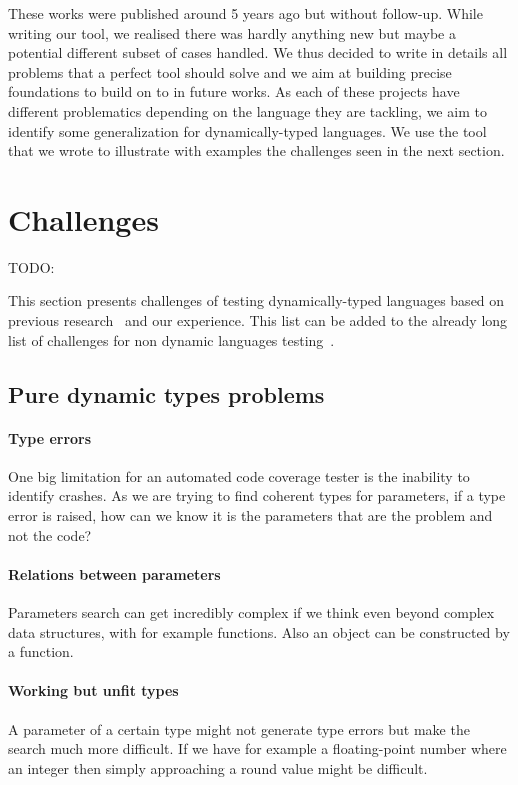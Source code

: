 \documentclass{llncs2e/llncs}
\makeatletter
\def\todo#1{{\color{red}TODO\@: #1}}
\makeatother
\begin{document}
These works were published around 5 years ago but without follow-up. While
writing our tool, we realised there was hardly anything new but maybe a
potential different subset of cases handled. We thus decided to write in details
all problems that a perfect tool should solve and we aim at building precise
foundations to build on to in future works. As each of these projects have
different problematics depending on the language they are tackling, we aim to
identify some generalization for dynamically-typed languages. We use the tool
that we wrote to illustrate with examples the challenges seen in the next
section.


\section{Challenges}
\label{challenges}
\todo{}

This section presents challenges of testing dynamically-typed languages based on
previous research~\cite{ducasse2011challenges} and our experience. This list
can be added to the already long list of challenges for non dynamic languages
testing~\cite{mcminn2011search}.

\subsection{Pure dynamic types problems}
\paragraph{Type errors} One big limitation for an automated code coverage tester
is the inability to identify crashes. As we are trying to find coherent types
for parameters, if a type error is raised, how can we know it is the parameters
that are the problem and not the code?

\paragraph{Relations between parameters} Parameters search can get incredibly
complex if we think even beyond complex data structures, with for example
functions. Also an object can be constructed by a function.

\paragraph{Working but unfit types} A parameter of a certain type might not
generate type errors but make the search much more difficult. If we have for
example a floating-point number where an integer then simply approaching a round
value might be difficult.
\end{document}
